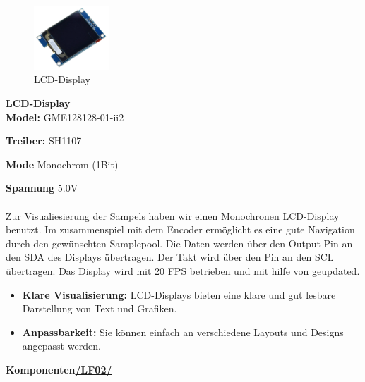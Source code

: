\vspace{3em}

\begin{figure} %
	\vspace{-20pt + 0.02\textwidth}
	\hspace{0.06\textwidth} %
	\includegraphics[width=0.25\textwidth]{images/05_technische_spezifikation/Interface/Display.png} %
	\caption{LCD-Display}
	\label{fig:lcd_display}
	\vspace{-50pt}
\end{figure}

\textbf{\hypertarget{Display}{LCD-Display}} \\

\textbf{Model:} GME128128-01-ii2

\textbf{Treiber:} SH1107

\textbf{Mode} Monochrom (1Bit)

\textbf{Spannung} 5.0V \\ \\



Zur Visualiesierung der Sampels haben wir einen Monochronen LCD-Display benutzt. Im zusammenspiel mit dem Encoder ermöglicht es eine gute Navigation durch den gewünschten Samplepool. Die Daten werden über den Output Pin   an den SDA des Displays übertragen. Der Takt wird über den Pin   an den SCL übertragen. Das Display wird mit 20 FPS betrieben und mit hilfe von  geupdated.

\begin{itemize}
	\item \textbf{Klare Visualisierung:} LCD-Displays bieten eine klare und gut lesbare Darstellung von Text und Grafiken.
	\item \textbf{Anpassbarkeit:} Sie können einfach an verschiedene Layouts und Designs angepasst werden.
\end{itemize}

\newpage
\textbf{Komponenten\hyperlink{LF02_Link}{/LF02/}} \\

